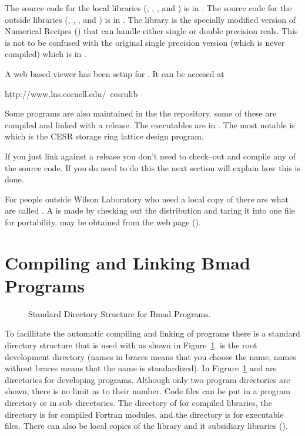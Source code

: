 The source code for the local libraries (, ,
, and ) is in . The
source code for the outside libraries (, ,
, and ) is in . The
 library is the specially modified version of
Numerical Recipes () that can handle either single or
double precision reals. This is not to be confused with the original
single precision version (which is never compiled) 
which is in . 

A web based viewer has been setup for \bmad. It can be accesed at
\begin{example}
  http://www.lns.cornell.edu/~cesrulib
\end{example}

Some programs are also maintained in the the \cvs repository. some of
these are compiled and linked with a release. The executables are in
. The most notable is  which is the CESR
storage ring lattice design program.

If you just link against a release you don't need to check--out and
compile any of the \bmad source code. If you do need to do this the
next section will explain how this is done.

For people outside Wilson Laboratory who need a local copy of \bmad
there are what are called . A  is
made by checking out the \bmad distribution and taring it into one
file for portability.  may be obtained from the
\bmad web page ().

\section{Compiling and Linking Bmad Programs}
\label{s:compile}

\begin{figure}[htb]
\begin{centering}
\caption{Standard Directory Structure for Bmad Programs.}
\end{centering}
\label{f:program_dir}
\end{figure}

To facillitate the automatic compiling and linking of programs there
is a standard directory structure that is used with \bmad as shown in
Figure~\ref{f:program_dir}.  is the root development
directory (names in braces  means that you choose the name,
names without braces means that the name is standardized). In
Figrure~\ref{f:program_dir}  and 
are directories for developing programs. Although only two program
directories are shown, there is no limit as to their number. Code
files can be put in a program directory or in sub--directories. The
 directory of for compiled libraries, the 
directory is for compiled Fortran modules, and the  directory
is for executable files. There can also be local copies of the
 library and it subsidiary libraries ().

